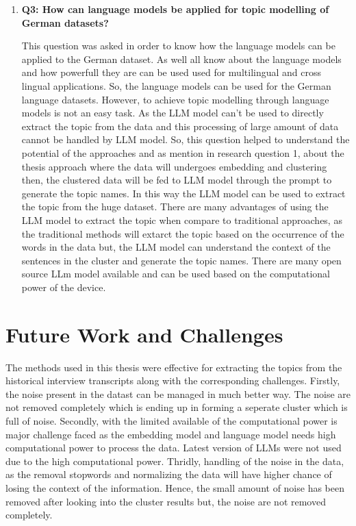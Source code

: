 \begin{enumerate}
    \vspace{0.3cm}
    \item\textbf{Q3: How can language models be applied for topic modelling of German datasets?}
    
    This question was asked in order to know how the language models can be applied to the German dataset. As well all know about the language models and how powerfull they are can be used
    used for multilingual and cross lingual applications. So, the language models can be used for the German language datasets. However, to achieve topic modelling through language models
    is not an easy task. As the LLM model can't be used to directly extract the topic from the data and this processing of large amount of data cannot be handled by LLM model. So, this question
    helped to understand the potential of the approaches and as mention in research question 1, about the thesis approach where the data will undergoes embedding and clustering then, the clustered 
    data will be fed to LLM model through the prompt to generate the topic names. In this way the LLM model can be used to extract the topic from the huge dataset. There are many advantages of using the
    LLM model to extract the topic when compare to traditional approaches, as the traditional methods will extarct the topic based on the occurrence of the words in the data but, the LLM model
    can understand the context of the sentences in the cluster and generate the topic names. There are many open source LLm model available and can be used based on the computational power of the device.

\end{enumerate}

\section{Future Work and Challenges}

The methods used in this thesis were effective for extracting the topics from the historical interview transcripts along with the corresponding
challenges. Firstly, the noise present in the datast can be managed in much better way. The noise are not removed completely which is ending up in 
forming a seperate cluster which is full of noise. Secondly, with the limited available of the computational power is major challenge 
faced as the embedding model and language model needs high computational power to process the data. 
Latest version of LLMs were not used due to the high computational power. 
Thridly, handling of the noise in the data, as the removal stopwords and normalizing the data will have higher chance of losing the context of the
information. Hence, the small amount of noise has been removed after looking into the cluster results but, the noise are not removed completely.

